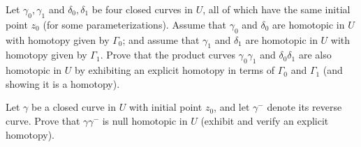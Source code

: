 \documentclass[10pt]{amsart}
\begin{document}
\begin{thm}
  \label{Ex4}
  Let $\gamma_0, \gamma_1$ and $\delta_0,\delta_1$ be four closed curves in $U$,
all of which have the same initial point $z_0$ (for some parameterizations).  
Assume that $\gamma_0$ and $\delta_0$ are
homotopic in $U$ with homotopy given by $\Gamma_0$;
and assume that $\gamma_1$ and $\delta_1$ are homotopic in $U$ with homotopy
given by $\Gamma_1$.
Prove that the product curves $\gamma_0 \gamma_1$ and $\delta_0 \delta_1$ are also homotopic
in $U$ by exhibiting an explicit homotopy in terms of $\Gamma_0$ and $\Gamma_1$
(and showing it is a homotopy).
\end{thm}

\begin{thm}
  \label{Ex5}
  Let $\gamma$ be a closed curve in $U$ with initial point $z_0$, and let
$\gamma^{-}$ denote its reverse curve.
Prove that $\gamma \gamma^{-}$ is null homotopic
in $U$ (exhibit and verify an explicit homotopy).
\end{thm}
\end{document}
